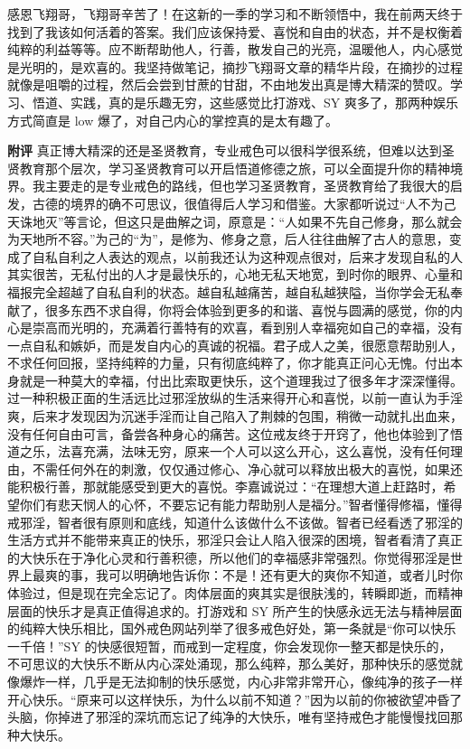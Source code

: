 \begin{case}
    感恩飞翔哥，飞翔哥辛苦了！在这新的一季的学习和不断领悟中，我在前两天终于找到了我该如何活着的答案。我们应该保持爱、喜悦和自由的状态，并不是权衡着纯粹的利益等等。应不断帮助他人，行善，散发自己的光亮，温暖他人，内心感觉是光明的，是欢喜的。我坚持做笔记，摘抄飞翔哥文章的精华片段，在摘抄的过程就像是咀嚼的过程，然后会尝到甘蔗的甘甜，不由地发出真是博大精深的赞叹。学习、悟道、实践，真的是乐趣无穷，这些感觉比打游戏、SY 爽多了，那两种娱乐方式简直是 low 爆了，对自己内心的掌控真的是太有趣了。

    \textbf{附评} 真正博大精深的还是圣贤教育，专业戒色可以很科学很系统，但难以达到圣贤教育那个层次，学习圣贤教育可以开启悟道修德之旅，可以全面提升你的精神境界。我主要走的是专业戒色的路线，但也学习圣贤教育，圣贤教育给了我很大的启发，古德的境界的确不可思议，很值得后人学习和借鉴。大家都听说过“人不为己天诛地灭”等言论，但这只是曲解之词，原意是：“人如果不先自己修身，那么就会为天地所不容。”为己的“为”，是修为、修身之意，后人往往曲解了古人的意思，变成了自私自利之人表达的观点，以前我还认为这种观点很对，后来才发现自私的人其实很苦，无私付出的人才是最快乐的，心地无私天地宽，到时你的眼界、心量和福报完全超越了自私自利的状态。越自私越痛苦，越自私越狭隘，当你学会无私奉献了，很多东西不求自得，你将会体验到更多的和谐、喜悦与圆满的感觉，你的内心是崇高而光明的，充满着行善特有的欢喜，看到别人幸福宛如自己的幸福，没有一点自私和嫉妒，而是发自内心的真诚的祝福。君子成人之美，很愿意帮助别人，不求任何回报，坚持纯粹的力量，只有彻底纯粹了，你才能真正问心无愧。付出本身就是一种莫大的幸福，付出比索取更快乐，这个道理我过了很多年才深深懂得。过一种积极正面的生活远比过邪淫放纵的生活来得开心和喜悦，以前一直认为手淫爽，后来才发现因为沉迷手淫而让自己陷入了荆棘的包围，稍微一动就扎出血来，没有任何自由可言，备尝各种身心的痛苦。这位戒友终于开窍了，他也体验到了悟道之乐，法喜充满，法味无穷，原来一个人可以这么开心，这么喜悦，没有任何理由，不需任何外在的刺激，仅仅通过修心、净心就可以释放出极大的喜悦，如果还能积极行善，那就能感受到更大的喜悦。李嘉诚说过：“在理想大道上赶路时，希望你们有悲天悯人的心怀，不要忘记有能力帮助别人是福分。”智者懂得修福，懂得戒邪淫，智者很有原则和底线，知道什么该做什么不该做。智者已经看透了邪淫的生活方式并不能带来真正的快乐，邪淫只会让人陷入很深的困境，智者看清了真正的大快乐在于净化心灵和行善积德，所以他们的幸福感非常强烈。你觉得邪淫是世界上最爽的事，我可以明确地告诉你：不是！还有更大的爽你不知道，或者儿时你体验过，但是现在完全忘记了。肉体层面的爽其实是很肤浅的，转瞬即逝，而精神层面的快乐才是真正值得追求的。打游戏和 SY 所产生的快感永远无法与精神层面的纯粹大快乐相比，国外戒色网站列举了很多戒色好处，第一条就是“你可以快乐一千倍！”SY 的快感很短暂，而戒到一定程度，你会发现你一整天都是快乐的，不可思议的大快乐不断从内心深处涌现，那么纯粹，那么美好，那种快乐的感觉就像爆炸一样，几乎是无法抑制的快乐感觉，内心非常非常开心，像纯净的孩子一样开心快乐。“原来可以这样快乐，为什么以前不知道？”因为以前的你被欲望冲昏了头脑，你掉进了邪淫的深坑而忘记了纯净的大快乐，唯有坚持戒色才能慢慢找回那种大快乐。
\end{case}

